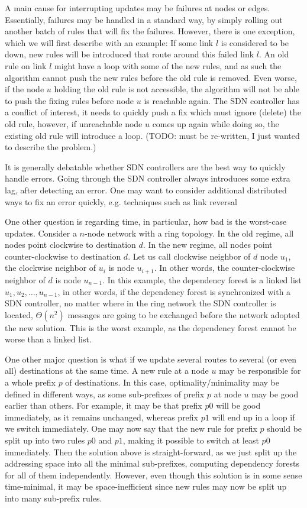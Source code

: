 A main cause for interrupting updates may be failures at nodes or edges. Essentially, failures may be handled in a standard way, by simply rolling out another batch of rules that will fix the failures. However, there is one exception, which we will first describe with an example: If some link $l$ is considered to be down, new rules will be introduced that route around this failed link $l$. An old rule on link $l$ might have a loop with some of the new rules, and as such the algorithm cannot push the new rules before the old rule is removed. Even worse, if the node $u$ holding the old rule is not accessible, the algorithm will not be able to push the fixing rules before node $u$ is reachable again. The SDN controller has a conflict of interest, it needs to quickly push a fix which must ignore (delete) the old rule, however, if unreachable node $u$ comes up again while doing so, the existing old rule will introduce a loop. (TODO: must be re-written, I just wanted to describe the problem.)

It is generally debatable whether SDN controllers are the best way to quickly handle errors. Going through the SDN controller always introduces some extra lag, after detecting an error. One may want to consider additional distributed ways to fix an error quickly, e.g. techniques such as link reversal \cite{originallinkreversalpaperforinstanceorsomethingnewer}

One other question is regarding time, in particular, how bad is the worst-case updates. Consider a $n$-node network with a ring topology. In the old regime, all nodes point clockwise to destination $d$. In the new regime, all nodes point counter-clockwise to destination $d$. Let us call clockwise neighbor of $d$ node $u_1$, the clockwise neighbor of $u_i$ is node $u_{i+1}$. In other words, the counter-clockwise neighbor of $d$ is node $u_{n-1}$. In this example, the dependency forest is a linked list $u_1,u_2,\ldots,u_{n-1}$, in other words, if the dependency forest is synchronized with a SDN controller, no matter where in the ring network the SDN controller is located, $\Theta(n^2)$ messages are going to be exchanged before the network adopted the new solution. This is the worst example, as the dependency forest cannot be worse than a linked list.

One other major question is what if we update several routes to several (or even all) destinations at the same time. A new rule at a node $u$ may be responsible for a whole prefix $p$ of destinations. In this case, optimality/minimality may be defined in different ways, as some sub-prefixes of prefix $p$ at node $u$ may be good earlier than others. For example, it may be that prefix $p0$ will be good immediately, as it remains unchanged, whereas prefix $p1$ will end up in a loop if we switch immediately. One may now say that the new rule for prefix $p$ should be split up into two rules $p0$ and $p1$, making it possible to switch at least $p0$ immediately. Then the solution above is straight-forward, as we just split up the addressing space into all the minimal sub-prefixes, computing dependency forests for all of them independently. However, even though this solution is in some sense time-minimal, it may be space-inefficient since new rules may now be split up into many sub-prefix rules.


